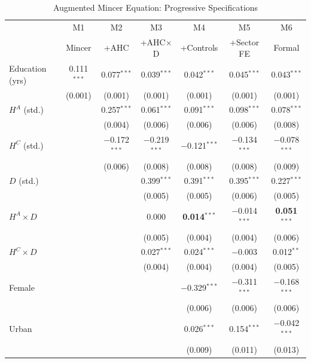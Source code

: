 \documentclass[11pt,a4paper]{article}
\theoremstyle{definition}
\begin{document}
\begin{table}[htbp]
\centering
\caption{Augmented Mincer Equation: Progressive Specifications}
\label{tab:main}
\small
\begin{tabular}{lcccccc}
\toprule
 & M1 & M2 & M3 & M4 & M5 & M6 \\
 & Mincer & +AHC & +AHC$\times$D & +Controls & +Sector FE & Formal \\
\midrule
Education (yrs) & 0.111$^{***}$ & 0.077$^{***}$ & 0.039$^{***}$ & 0.042$^{***}$ & 0.045$^{***}$ & 0.043$^{***}$ \\
 & \footnotesize(0.001) & \footnotesize(0.001) & \footnotesize(0.001) & \footnotesize(0.001) & \footnotesize(0.001) & \footnotesize(0.001) \\[4pt]
$H^A$ (std.) &  & 0.257$^{***}$ & 0.061$^{***}$ & 0.091$^{***}$ & 0.098$^{***}$ & 0.078$^{***}$ \\
 &  & \footnotesize(0.004) & \footnotesize(0.006) & \footnotesize(0.006) & \footnotesize(0.006) & \footnotesize(0.008) \\[4pt]
$H^C$ (std.) &  & $-$0.172$^{***}$ & $-$0.219$^{***}$ & $-$0.121$^{***}$ & $-$0.134$^{***}$ & $-$0.078$^{***}$ \\
 &  & \footnotesize(0.006) & \footnotesize(0.008) & \footnotesize(0.008) & \footnotesize(0.008) & \footnotesize(0.009) \\[4pt]
$D$ (std.) &  &  & 0.399$^{***}$ & 0.391$^{***}$ & 0.395$^{***}$ & 0.227$^{***}$ \\
 &  &  & \footnotesize(0.005) & \footnotesize(0.005) & \footnotesize(0.006) & \footnotesize(0.005) \\[4pt]
$H^A \times D$ &  &  & 0.000 & \textbf{0.014}$^{***}$ & $-$0.014$^{***}$ & \textbf{0.051}$^{***}$ \\
 &  &  & \footnotesize(0.005) & \footnotesize(0.004) & \footnotesize(0.004) & \footnotesize(0.006) \\[4pt]
$H^C \times D$ &  &  & 0.027$^{***}$ & 0.024$^{***}$ & $-$0.003 & 0.012$^{**}$ \\
 &  &  & \footnotesize(0.004) & \footnotesize(0.004) & \footnotesize(0.004) & \footnotesize(0.005) \\[4pt]
Female &  &  &  & $-$0.329$^{***}$ & $-$0.311$^{***}$ & $-$0.168$^{***}$ \\
 &  &  &  & \footnotesize(0.006) & \footnotesize(0.006) & \footnotesize(0.006) \\[4pt]
Urban &  &  &  & 0.026$^{***}$ & 0.154$^{***}$ & $-$0.042$^{***}$ \\
 &  &  &  & \footnotesize(0.009) & \footnotesize(0.011) & \footnotesize(0.013) \\

\end{tabular}
\end{table}
\end{document}
